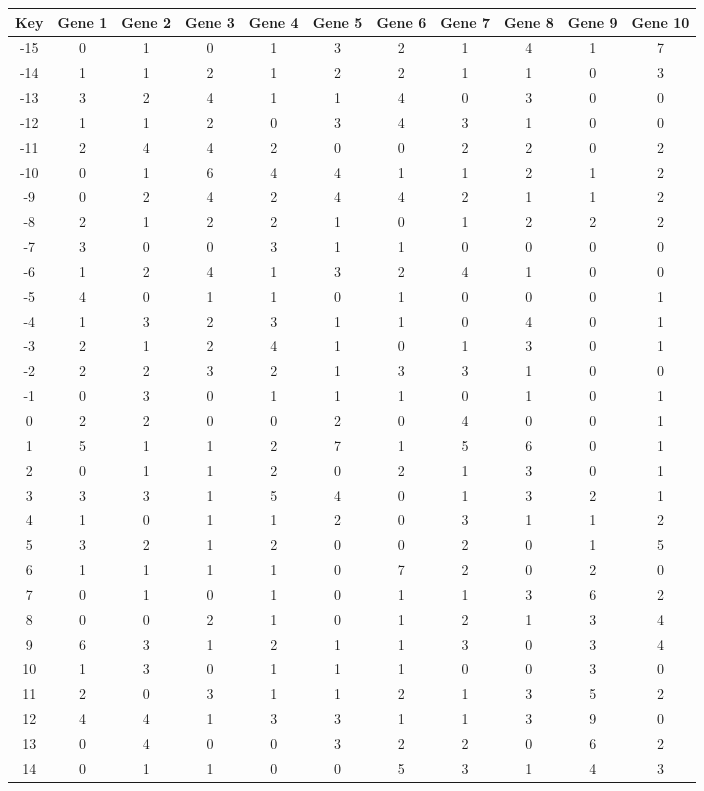 \begin{tabular}{|c|c|c|c|c|c|c|c|c|c|c|}
\hline
Key & Gene 1 & Gene 2 & Gene 3 & Gene 4 & Gene 5 & Gene 6 & Gene 7 & Gene 8 & Gene 9 & Gene 10 \\
\hline
-15 & 0 & 1 & 0 & 1 & 3 & 2 & 1 & 4 & 1 & 7 \\
-14 & 1 & 1 & 2 & 1 & 2 & 2 & 1 & 1 & 0 & 3 \\
-13 & 3 & 2 & 4 & 1 & 1 & 4 & 0 & 3 & 0 & 0 \\
-12 & 1 & 1 & 2 & 0 & 3 & 4 & 3 & 1 & 0 & 0 \\
-11 & 2 & 4 & 4 & 2 & 0 & 0 & 2 & 2 & 0 & 2 \\
-10 & 0 & 1 & 6 & 4 & 4 & 1 & 1 & 2 & 1 & 2 \\
-9 & 0 & 2 & 4 & 2 & 4 & 4 & 2 & 1 & 1 & 2 \\
-8 & 2 & 1 & 2 & 2 & 1 & 0 & 1 & 2 & 2 & 2 \\
-7 & 3 & 0 & 0 & 3 & 1 & 1 & 0 & 0 & 0 & 0 \\
-6 & 1 & 2 & 4 & 1 & 3 & 2 & 4 & 1 & 0 & 0 \\
-5 & 4 & 0 & 1 & 1 & 0 & 1 & 0 & 0 & 0 & 1 \\
-4 & 1 & 3 & 2 & 3 & 1 & 1 & 0 & 4 & 0 & 1 \\
-3 & 2 & 1 & 2 & 4 & 1 & 0 & 1 & 3 & 0 & 1 \\
-2 & 2 & 2 & 3 & 2 & 1 & 3 & 3 & 1 & 0 & 0 \\
-1 & 0 & 3 & 0 & 1 & 1 & 1 & 0 & 1 & 0 & 1 \\
0 & 2 & 2 & 0 & 0 & 2 & 0 & 4 & 0 & 0 & 1 \\
1 & 5 & 1 & 1 & 2 & 7 & 1 & 5 & 6 & 0 & 1 \\
2 & 0 & 1 & 1 & 2 & 0 & 2 & 1 & 3 & 0 & 1 \\
3 & 3 & 3 & 1 & 5 & 4 & 0 & 1 & 3 & 2 & 1 \\
4 & 1 & 0 & 1 & 1 & 2 & 0 & 3 & 1 & 1 & 2 \\
5 & 3 & 2 & 1 & 2 & 0 & 0 & 2 & 0 & 1 & 5 \\
6 & 1 & 1 & 1 & 1 & 0 & 7 & 2 & 0 & 2 & 0 \\
7 & 0 & 1 & 0 & 1 & 0 & 1 & 1 & 3 & 6 & 2 \\
8 & 0 & 0 & 2 & 1 & 0 & 1 & 2 & 1 & 3 & 4 \\
9 & 6 & 3 & 1 & 2 & 1 & 1 & 3 & 0 & 3 & 4 \\
10 & 1 & 3 & 0 & 1 & 1 & 1 & 0 & 0 & 3 & 0 \\
11 & 2 & 0 & 3 & 1 & 1 & 2 & 1 & 3 & 5 & 2 \\
12 & 4 & 4 & 1 & 3 & 3 & 1 & 1 & 3 & 9 & 0 \\
13 & 0 & 4 & 0 & 0 & 3 & 2 & 2 & 0 & 6 & 2 \\
14 & 0 & 1 & 1 & 0 & 0 & 5 & 3 & 1 & 4 & 3 \\
\hline
\end{tabular}
